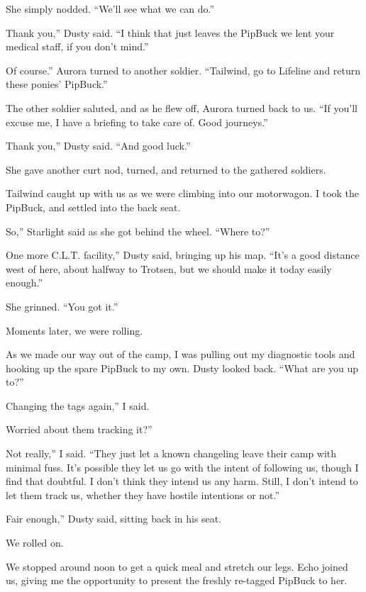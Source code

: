 She simply nodded. “We’ll see what we can do.”

\leavevmode{}Thank you,” Dusty said. “I think that just leaves the PipBuck we lent your medical staff, if you don’t mind.”

\leavevmode{}Of course.” Aurora turned to another soldier. “Tailwind, go to Lifeline and return these ponies’ PipBuck.”

The other soldier saluted, and as he flew off, Aurora turned back to us. “If you’ll excuse me, I have a briefing to take care of. Good journeys.”

\leavevmode{}Thank you,” Dusty said. “And good luck.”

She gave another curt nod, turned, and returned to the gathered soldiers.

Tailwind caught up with us as we were climbing into our motorwagon. I took the PipBuck, and settled into the back seat.

\leavevmode{}So,” Starlight said as she got behind the wheel. “Where to?”

\leavevmode{}One more C.L.T. facility,” Dusty said, bringing up his map. “It’s a good distance west of here, about halfway to Trotsen, but we should make it today easily enough.”

She grinned. “You got it.”

Moments later, we were rolling.

As we made our way out of the camp, I was pulling out my diagnostic tools and hooking up the spare PipBuck to my own. Dusty looked back. “What are you up to?”

\leavevmode{}Changing the tags again,” I said.

\leavevmode{}Worried about them tracking it?”

\leavevmode{}Not really,” I said. “They just let a known changeling leave their camp with minimal fuss. It’s possible they let us go with the intent of following us, though I find that doubtful. I don’t think they intend us any harm. Still, I don’t intend to let them track us, whether they have hostile intentions or not.”

\leavevmode{}Fair enough,” Dusty said, sitting back in his seat.

We rolled on.

{\br}%
We stopped around noon to get a quick meal and stretch our legs. Echo joined us, giving me the opportunity to present the freshly re-tagged PipBuck to her.

